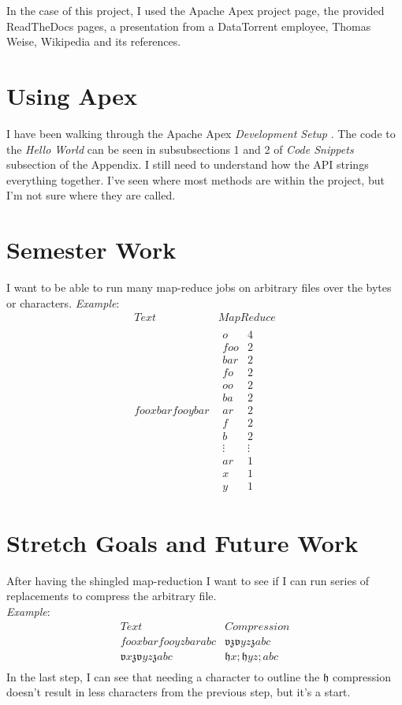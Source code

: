 \documentclass[11 pt]{IEEEtran}
\newcommand{\h}{\lal{h}}
\newcommand{\lal}[1]{\mathfrak{#1}}
\renewcommand{\v}{\lal{v}}
\newcommand{\z}{\lal{z}}
\begin{document}
In the case of this project, I used the Apache Apex project page\cite{APEX}, the provided ReadTheDocs pages\cite{APEXrtd_dt}\cite{APEXrtd_apache}\cite{MALHAR}, a presentation from a DataTorrent employee, Thomas Weise\cite{WEISE}, Wikipedia and its references\cite{WIKI}\cite{DATANAMI}.
 
 \section{Using Apex}
I have been walking through the Apache Apex \textit{Development Setup} \cite{APEXrtd_apache}. The code to the \textit{Hello World} can be seen in subsubsections 1 and 2  of \textit{Code Snippets} subsection of the Appendix. I still need to understand how the API strings everything together. I've seen where most methods are within the project, but I'm not sure where they are called.

\section{Semester Work}
I want to be able to run many map-reduce jobs on arbitrary files over the bytes or characters.
\textit{Example}:
$$
\begin{array}{c|c}
Text & MapReduce\\
\hline
fooxbar fooybar & \begin{array}{cc}
o & 4 \\
foo & 2 \\
bar & 2 \\
fo & 2 \\
oo & 2 \\
ba & 2 \\
ar & 2 \\
f & 2 \\
b & 2 \\
\vdots & \vdots \\
ar & 1 \\
x & 1 \\
y & 1
\end{array}
\end{array}
$$

\section{Stretch Goals and Future Work}
After having the shingled map-reduction I want to see if I can run series of replacements to compress the arbitrary file.\\
\textit{Example}:
$$
\begin{array}{c|c}
Text & Compression\\
\hline
fooxbar fooyzbar abc& \v \z \v yz\z abc\\
\v x\z \v yz\z abc & \h x; \h yz;abc\\
\end{array}
$$
In the last step, I can see that needing a character to outline the $\h$ compression doesn't result in less characters from the previous step, but it's a start.
\end{document}

